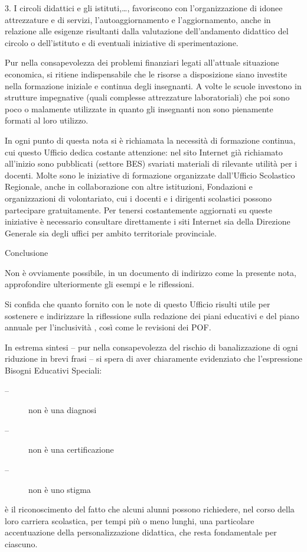 \begin{description}
\begin{enumerate}
{	3. I circoli didattici e gli istituti,…, favoriscono con l'organizzazione di idonee attrezzature e di servizi,
	l'autoaggiornamento e l'aggiornamento, anche in relazione alle esigenze risultanti dalla valutazione
	dell'andamento didattico del circolo o dell'istituto e di eventuali iniziative di sperimentazione}.

	Pur nella consapevolezza dei problemi finanziari legati all'attuale situazione economica, si ritiene
	indispensabile che le risorse a disposizione siano investite nella formazione iniziale e continua degli
	insegnanti. A volte le scuole investono in strutture impegnative (quali complesse attrezzature
	laboratoriali) che poi sono poco o malamente utilizzate in quanto gli insegnanti non sono pienamente
	formati al loro utilizzo.
	
	In ogni punto di questa nota si è richiamata la necessità di formazione continua, cui questo Ufficio
	dedica costante attenzione: nel sito Internet già richiamato all'inizio sono pubblicati (settore BES)
	svariati materiali di rilevante utilità per i docenti. Molte sono le iniziative di formazione organizzate
	dall'Ufficio Scolastico Regionale, anche in collaborazione con altre istituzioni, Fondazioni e
	organizzazioni di volontariato, cui i docenti e i dirigenti scolastici possono partecipare gratuitamente.
	Per tenersi costantemente aggiornati su queste iniziative è necessario consultare direttamente i siti
	Internet sia della Direzione Generale sia degli uffici per ambito territoriale provinciale.
	
 \end{enumerate}
\item Conclusione

 Non è ovviamente possibile, in un documento di indirizzo come la presente nota, approfondire
 ulteriormente gli esempi e le riflessioni.
 
 Si confida che quanto fornito con le note di questo Ufficio risulti utile per sostenere e indirizzare la
 riflessione sulla redazione dei piani educativi e del piano annuale per l'inclusività , così come le revisioni
 dei POF.
 
 In estrema sintesi – pur nella consapevolezza del rischio di banalizzazione di ogni riduzione in brevi
 frasi – si spera di aver chiaramente evidenziato che l'espressione Bisogni Educativi Speciali:
 \begin{description}
 	\item[--] non è una diagnosi
 	\item[--] non è una certificazione
 	\item[--] non è uno stigma
 \end{description}
 è il riconoscimento del fatto che alcuni alunni possono richiedere, nel corso della loro carriera
 scolastica, per tempi più o meno lunghi, una particolare accentuazione della personalizzazione
 didattica, che resta fondamentale per ciascuno.
 

\end{description}
